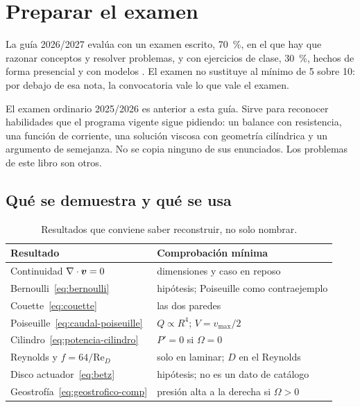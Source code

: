 \chapter{Preparar el examen}
\label{ch:examen}

La guía 2026/2027 evalúa con un examen escrito, 70~\%, en el que hay que razonar conceptos y resolver problemas, y con ejercicios de clase, 30~\%, hechos de forma presencial y con modelos \parencite{uleGuia2026}. El examen no sustituye al mínimo de 5 sobre 10: por debajo de esa nota, la convocatoria vale lo que vale el examen.

El examen ordinario 2025/2026 es anterior a esta guía. Sirve para reconocer habilidades que el programa vigente sigue pidiendo: un balance con resistencia, una función de corriente, una solución viscosa con geometría cilíndrica y un argumento de semejanza. No se copia ninguno de sus enunciados. Los problemas de este libro son otros.

\section{Qué se demuestra y qué se usa}

\begin{table}[ht]
\centering
\caption{Resultados que conviene saber reconstruir, no solo nombrar.}
\label{tab:reconstruir}
\begin{tabular}{@{}p{}p{}@{}}
\toprule
Resultado & Comprobación mínima \\
\midrule
Continuidad \(\nabla\cdot\boldsymbol{v}=0\) & dimensiones y caso en reposo \\
Bernoulli~\eqref{eq:bernoulli} & hipótesis; Poiseuille como contraejemplo \\
Couette~\eqref{eq:couette} & las dos paredes \\
Poiseuille~\eqref{eq:caudal-poiseuille} & \(Q\propto R^4\); \(V=v_{\max}/2\) \\
Cilindro~\eqref{eq:potencia-cilindro} & \(P'=0\) si \(\Omega=0\) \\
Reynolds y \(f=64/\mathrm{Re}_D\) & solo en laminar; \(D\) en el Reynolds \\
Disco actuador~\eqref{eq:betz} & hipótesis; no es un dato de catálogo \\
Geostrofía~\eqref{eq:geostrofico-comp} & presión alta a la derecha si \(\Omega>0\) \\
\bottomrule
\end{tabular}
\end{table}

